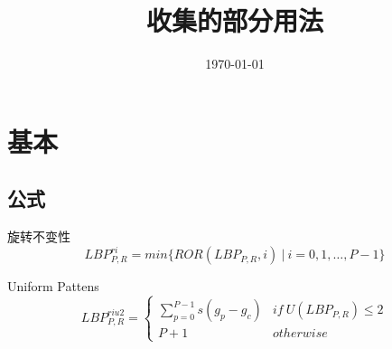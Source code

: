 \documentclass{./banyuan-ppt}
\title{收集的部分用法}
\author{}
\institute{}
\date{\today}
\begin{document}
\createtitle
\createoutline

\section{基本}
\subsection{公式}
\begin{frame}
        \begin{block}{旋转不变性} 
            \begin{equation*}
                LBP^{ri}_{P,R} = min \{ ROR(LBP_{P,R},i) \ | \  i = 0,1,\dots,P-1\} 
            \end{equation*}
        \end{block}

        \begin{block}{Uniform Pattens} 
            \begin{equation*}
                LBP^{riu2}_{P,R} = 
                \begin{cases}
                    \sum^{P-1}_{p=0} s(g_p - g_c) & if \  U(LBP_{P,R}) \leq 2 \\
                    P+1 & otherwise
                \end{cases} 
            \end{equation*}
        \end{block}
\end{frame}
\end{document}
